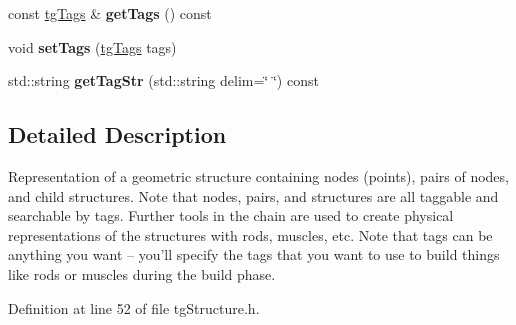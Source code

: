 \begin{DoxyCompactItemize}
\item 
\hypertarget{classtg_taggable_ae70d7d3b45301665bc363b0ed8b9b292}{const \hyperlink{classtg_tags}{tg\-Tags} \& {\bfseries get\-Tags} () const }\label{classtg_taggable_ae70d7d3b45301665bc363b0ed8b9b292}

\item 
\hypertarget{classtg_taggable_a5492888e4e4da4cca6261070b5726adf}{void {\bfseries set\-Tags} (\hyperlink{classtg_tags}{tg\-Tags} tags)}\label{classtg_taggable_a5492888e4e4da4cca6261070b5726adf}

\item 
\hypertarget{classtg_taggable_a346d66b066d2d9eb1eadba01da43749f}{std\-::string {\bfseries get\-Tag\-Str} (std\-::string delim=\char`\"{} \char`\"{}) const }\label{classtg_taggable_a346d66b066d2d9eb1eadba01da43749f}

\end{DoxyCompactItemize}


\subsection{Detailed Description}
Representation of a geometric structure containing nodes (points), pairs of nodes, and child structures. Note that nodes, pairs, and structures are all taggable and searchable by tags. Further tools in the chain are used to create physical representations of the structures with rods, muscles, etc. Note that tags can be anything you want -- you'll specify the tags that you want to use to build things like rods or muscles during the build phase. 

Definition at line 52 of file tg\-Structure.\-h.



